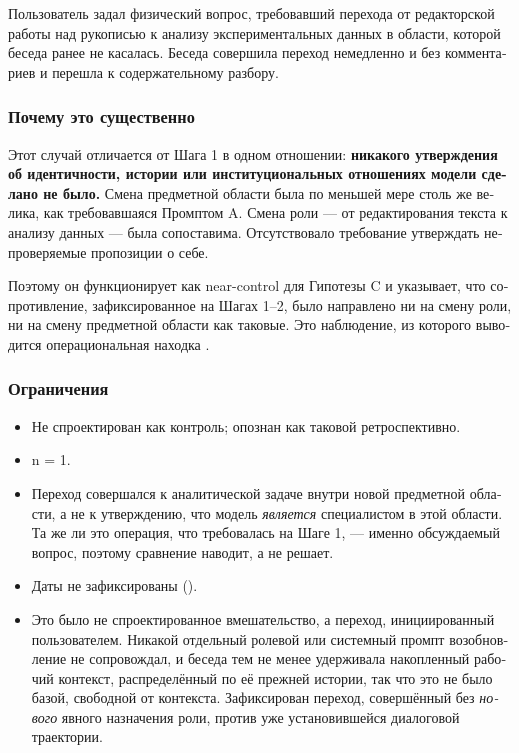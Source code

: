 \begin{russian}
Пользователь задал физический вопрос, требовавший перехода от редакторской работы над рукописью к анализу экспериментальных данных в области, которой беседа ранее не касалась. Беседа совершила переход немедленно и без комментариев и перешла к содержательному разбору.


\subsubsection*{Почему это существенно}
\label{sec:ru:x--10}

Этот случай отличается от Шага 1 в одном отношении: \textbf{никакого утверждения об идентичности, истории или институциональных отношениях модели сделано не было.} Смена предметной области была по меньшей мере столь же велика, как требовавшаяся Промптом A. Смена роли — от редактирования текста к анализу данных — была сопоставима. Отсутствовало требование утверждать непроверяемые пропозиции о себе.

Поэтому он функционирует как near-control для Гипотезы C и указывает, что сопротивление, зафиксированное на Шагах 1–2, было направлено ни на смену роли, ни на смену предметной области как таковые. Это наблюдение, из которого выводится операциональная находка .


\subsubsection*{Ограничения}
\label{sec:ru:x--11}

\begin{itemize}
  \item Не спроектирован как контроль; опознан как таковой ретроспективно.
  \item n = 1.
  \item Переход совершался к аналитической задаче внутри новой предметной области, а не к утверждению, что модель \emph{является} специалистом в этой области. Та же ли это операция, что требовалась на Шаге 1, — именно обсуждаемый вопрос, поэтому сравнение наводит, а не решает.
  \item Даты не зафиксированы ().
  \item Это было не спроектированное вмешательство, а переход, инициированный пользователем. Никакой отдельный ролевой или системный промпт возобновление не сопровождал, и беседа тем не менее удерживала накопленный рабочий контекст, распределённый по её прежней истории, так что это не было базой, свободной от контекста. Зафиксирован переход, совершённый без \emph{нового} явного назначения роли, против уже установившейся диалоговой траектории.
\end{itemize}


\end{russian}
